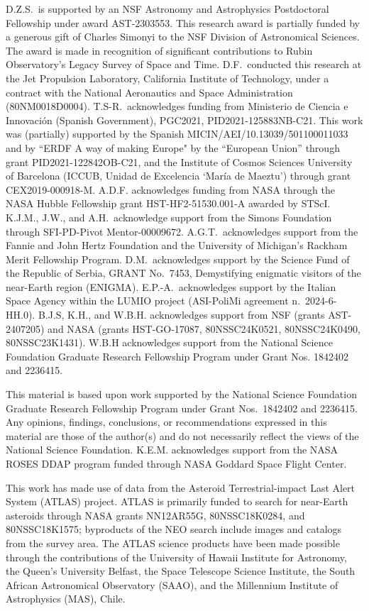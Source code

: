 \documentclass[twocolumn,longbib]{aastex7}
\begin{document}
\begin{CJK*}{UTF8}{gbsn}
\begin{acknowledgments}
D.Z.S.\ is supported by an NSF Astronomy and Astrophysics Postdoctoral Fellowship under award AST-2303553. This research award is partially funded by a generous gift of Charles Simonyi to the NSF Division of Astronomical Sciences. The award is made in recognition of significant contributions to Rubin Observatory's Legacy Survey of Space and Time.
D.F.\ conducted this research at the Jet Propulsion Laboratory, California Institute of Technology, under a contract with the National Aeronautics and Space Administration (80NM0018D0004).
T.S-R.\ acknowledges funding from Ministerio de Ciencia e Innovaci{\'o}n (Spanish Government), PGC2021, PID2021-125883NB-C21. This work was (partially) supported by the Spanish MICIN/AEI/10.13039/501100011033 and by ``ERDF A way of making Europe" by the “European Union” through grant PID2021-122842OB-C21, and the Institute of Cosmos Sciences University of Barcelona (ICCUB, Unidad de Excelencia `Mar\'ia de Maeztu’) through grant CEX2019-000918-M. A.D.F. acknowledges funding from NASA through the NASA Hubble Fellowship grant HST-HF2-51530.001-A awarded by STScI. K.J.M., J.W., and A.H.\ acknowledge support from the Simons Foundation through SFI-PD-Pivot Mentor-00009672. A.G.T.\ acknowledges support from the Fannie and John Hertz Foundation and the University of Michigan's Rackham Merit Fellowship Program. D.M.\ acknowledges support by the Science Fund of the Republic of Serbia, GRANT No.\ 7453, Demystifying enigmatic visitors of the near-Earth region (ENIGMA). E.P.-A.\ acknowledges support by the Italian Space Agency within the LUMIO project (ASI-PoliMi agreement n.\ 2024-6-HH.0).  B.J.S, K.H., and W.B.H. acknowledges support from NSF (grants AST-2407205) and NASA (grants HST-GO-17087, 80NSSC24K0521, 80NSSC24K0490, 80NSSC23K1431).  W.B.H acknowledges support from the National Science Foundation Graduate Research Fellowship Program under Grant Nos. 1842402 and 2236415.

This material is based upon work supported by the National Science Foundation Graduate Research Fellowship Program under Grant Nos.\ 1842402 and 2236415. Any opinions, findings, conclusions, or recommendations expressed in this material are those of the author(s) and do not necessarily reflect the views of the National Science Foundation. K.E.M. acknowledges support from the NASA ROSES DDAP program funded through NASA Goddard Space Flight Center.

This work has made use of data from the Asteroid Terrestrial-impact Last Alert System (ATLAS) project. ATLAS is primarily funded to search for near-Earth asteroids through NASA grants NN12AR55G, 80NSSC18K0284, and 80NSSC18K1575; byproducts of the NEO search include images and catalogs from the survey area.  The ATLAS science products have been  made possible through the contributions of the University of Hawaii Institute for Astronomy, the Queen's University Belfast, the Space Telescope Science Institute, the South African Astronomical Observatory (SAAO), and the Millennium Institute of Astrophysics (MAS), Chile.


\end{acknowledgments}
\end{CJK*}
\end{document}
